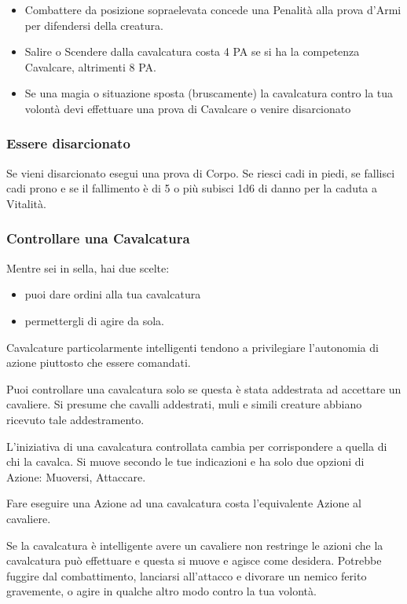 \documentclass[12pt,a4paper,twoside,openany]{book}
\begin{document}
\begin{multicols}{2}
\begin{itemize}
Se la cavalcatura è da "guerra" (addestrata al combattimento) la prova 2 bonus.

\item
Combattere da posizione sopraelevata concede una Penalità alla prova d'Armi per difendersi della creatura.

\item
Salire o Scendere dalla cavalcatura costa 4 PA se si ha la competenza Cavalcare, altrimenti 8 PA.

\item
Se una magia o situazione sposta (bruscamente) la cavalcatura contro la tua volontà devi effettuare una prova di Cavalcare o venire disarcionato
\end{itemize}


\subsubsection{Essere disarcionato}\label{esseredisarcionato}

Se vieni disarcionato esegui una prova di Corpo. Se riesci cadi in piedi, se fallisci cadi prono e se il fallimento è di 5 o più subisci 1d6 di danno per la caduta a Vitalità.


\subsubsection{Controllare una Cavalcatura}\label{controllocavalcatura}

Mentre sei in sella, hai due scelte:

\begin{itemize}
\item puoi dare ordini alla tua cavalcatura
\item permettergli di agire da sola.
\end{itemize}

Cavalcature particolarmente intelligenti tendono a privilegiare l'autonomia di azione piuttosto che essere comandati.

Puoi controllare una cavalcatura solo se questa è stata addestrata ad accettare un cavaliere. Si presume che cavalli addestrati, muli e simili creature abbiano ricevuto tale addestramento.

L'iniziativa di una cavalcatura controllata cambia per corrispondere a quella di chi la cavalca. Si muove secondo le tue indicazioni e ha solo due opzioni di Azione: Muoversi, Attaccare.

Fare eseguire una Azione ad una cavalcatura costa l'equivalente Azione al cavaliere.

Se la cavalcatura è intelligente avere un cavaliere non restringe le azioni che la cavalcatura può effettuare e questa si muove e agisce come desidera. Potrebbe fuggire dal combattimento, lanciarsi all'attacco e divorare un nemico ferito gravemente, o agire in qualche altro modo contro la tua volontà.

\end{multicols}
\end{document}
